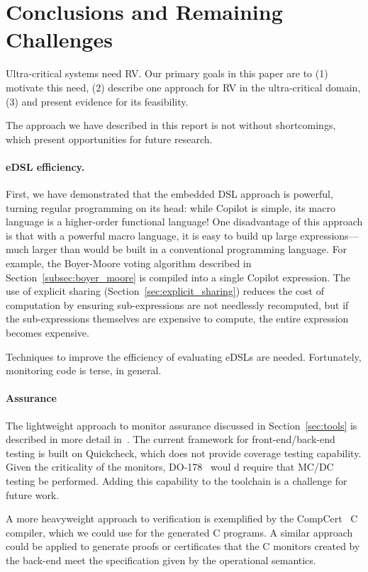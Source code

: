 \section{Conclusions and Remaining Challenges}
\label{sec:conclusions}
Ultra-critical systems need RV.  Our primary goals in this paper are to (1)
motivate this need, (2) describe one approach for RV in the ultra-critical
domain, (3) and present evidence for its feasibility.

The approach we have described in this report is not without shortcomings, which
present opportunities for future research.

\paragraph{eDSL efficiency.}
First, we have demonstrated that the embedded DSL approach is powerful,
turning regular programming on its head: while Copilot is simple, its
macro language is a higher-order functional language!  One disadvantage of this
approach is that with a powerful macro language, it is easy to
build up large expressions---much larger than would be built in a
conventional programming language.  For example, the Boyer-Moore
voting algorithm described in Section~\ref{subsec:boyer_moore} is compiled into
a single Copilot expression.  The use of explicit sharing
(Section~\ref{sec:explicit_sharing}) reduces the cost of computation by ensuring
sub-expressions are not needlessly recomputed, but if the sub-expressions
themselves are expensive to compute, the entire expression becomes expensive.

Techniques to improve the efficiency of evaluating eDSLs are needed.
Fortunately, monitoring code is terse, in general.  

\paragraph{Assurance}
The lightweight approach to monitor assurance discussed  in
Section~\ref{sec:tools}  is described in more detail
in~\cite{PikeWNG2012}.  The current framework for front-end/back-end
testing is built on Quickcheck, which does not provide coverage
testing capability.  Given the  criticality  of the
monitors, DO-178~\cite{DO178B} woul d require that MC/DC testing be
performed. Adding this capability to the toolchain is a challenge for
future work.  

  A more heavyweight approach to verification is exemplified by the
  CompCert~\cite{leroy} C compiler, which we could use for the
  generated C programs.  A similar approach could be applied to
  generate proofs or certificates that the C monitors created by the
  back-end meet the specification given by the operational
  semantics. 

